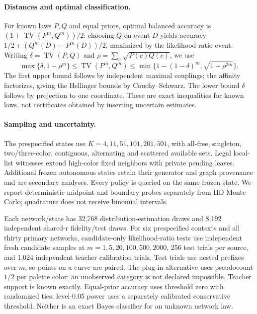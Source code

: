 \paragraph{Distances and optimal classification.}
For known laws $P,Q$ and equal priors, optimal balanced accuracy is
$(1+\operatorname{TV}(P^m,Q^m))/2$: choosing $Q$ on event $D$ yields accuracy
$1/2+(Q^m(D)-P^m(D))/2$, maximized by the likelihood-ratio event. Writing
$\delta=\operatorname{TV}(P,Q)$ and $\rho=\sum_c\sqrt{P(c)Q(c)}$, we use
\[
\max\{\delta,1-\rho^m\}\le\operatorname{TV}(P^m,Q^m)
\le\min\{1-(1-\delta)^m,\sqrt{1-\rho^{2m}}\}.
\]
The first upper bound follows by independent maximal couplings; the affinity
factorizes, giving the Hellinger bounds by Cauchy--Schwarz. The lower bound
$\delta$ follows by projection to one coordinate. These are exact inequalities
for known laws, not certificates obtained by inserting uncertain estimates.

\paragraph{Sampling and uncertainty.}
The prespecified states use $K=4,11,51,101,201,501$, with all-free, singleton,
two/three-color, contiguous, alternating and scattered available sets. Legal
local-list witnesses extend high-color fixed neighbors with private pending
leaves. Additional frozen autonomous states retain their generator and graph
provenance and are secondary analyses. Every policy is queried on the same
frozen state. We report deterministic midpoint and boundary probes separately
from IID Monte Carlo; quadrature does not receive binomial intervals.

Each network/state has 32,768 distribution-estimation draws and 8,192
independent shared-r fidelity/test draws. For six prespecified contexts and
all thirty primary networks, candidate-only likelihood-ratio tests use independent
fresh candidate samples at $m=1,5,20,100,500,2000$, 256 test trials per source,
and 1,024 independent teacher calibration trials. Test trials use nested
prefixes over $m$, so points on a curve are paired. The plug-in alternative
uses pseudocount $1/2$ per palette color: an unobserved category is not
declared impossible. Teacher support is known exactly. Equal-prior accuracy
uses threshold zero with randomized ties; level-0.05 power uses a separately
calibrated conservative threshold. Neither is an exact Bayes classifier for
an unknown network law.

